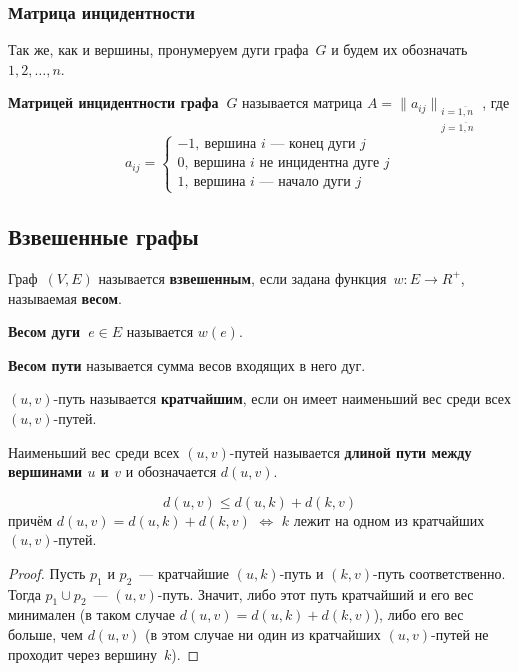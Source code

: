 \subsubsection{Матрица инцидентности}
Так же, как и вершины, пронумеруем дуги графа~$G$ и будем их обозначать $1, 2, \ldots, n$.

 \textbf{Матрицей инцидентности графа~$G$} называется матрица $A = \|a_{ij}\|_{\begin{smallmatrix}
i = \overline{1,n} \\
j = \overline{1,n}
\end{smallmatrix}}$, где
\begin{equation*}
a_{ij} =
\begin{cases}
-1, \ \text{вершина~$i$~--- конец дуги~$j$} \\
0, \ \text{вершина~$i$ не инцидентна дуге~$j$} \\
1, \ \text{вершина~$i$~--- начало дуги~$j$}
\end{cases}
\end{equation*}

\subsection{Взвешенные графы}
Граф~$(V, E)$ называется \textbf{взвешенным}, если задана функция~$w \colon E \to R^+$, называемая \textbf{весом}.

\textbf{Весом дуги~$e \in E$} называется $w(e)$.

\textbf{Весом пути} называется сумма весов входящих в него дуг.

$(u, v)$-путь называется \textbf{кратчайшим}, если он имеет наименьший вес среди всех $(u, v)$-путей.

Наименьший вес среди всех $(u, v)$-путей называется \textbf{длиной пути между вершинами $u$ и $v$} и обозначается $d(u, v)$.

\begin{statement}
\begin{equation*}
d(u, v) \leqslant d(u, k) + d(k, v)
\end{equation*}
причём $d(u, v) = d(u, k) + d(k, v)$ $\Leftrightarrow$ $k$ лежит на одном из кратчайших $(u, v)$-путей.
\end{statement}
\begin{proof}
Пусть $p_1$ и $p_2$~--- кратчайшие $(u, k)$-путь и $(k, v)$-путь соответственно.
Тогда $p_1 \cup p_2$~--- $(u, v)$-путь.
Значит, либо этот путь кратчайший и его вес минимален (в таком случае $d(u, v) = d(u, k) + d(k, v)$), либо его вес больше, чем $d(u, v)$ (в этом случае ни один из кратчайших $(u, v)$-путей не проходит через вершину~$k$).
\end{proof}

